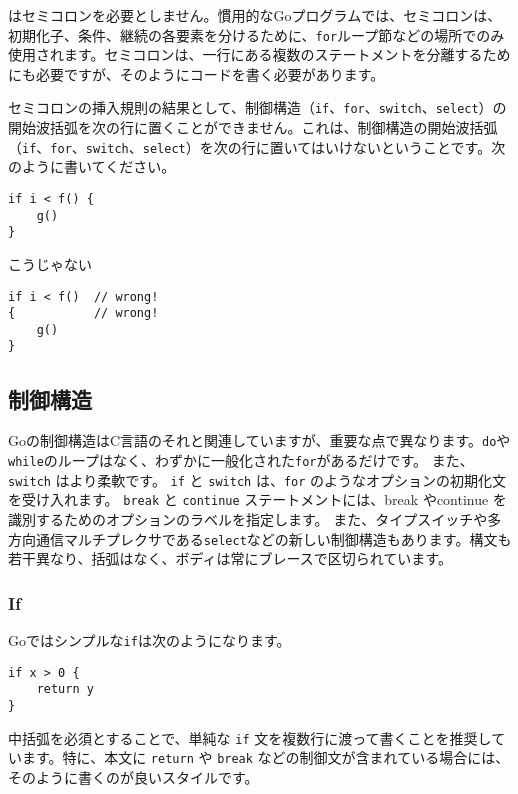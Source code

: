 \documentclass{jsarticle}
\begin{document}
はセミコロンを必要としません。慣用的なGoプログラムでは、セミコロンは、初期化子、条件、継続の各要素を分けるために、\texttt{for}ループ節などの場所でのみ使用されます。セミコロンは、一行にある複数のステートメントを分離するためにも必要ですが、そのようにコードを書く必要があります。

セミコロンの挿入規則の結果として、制御構造（\texttt{if}、\texttt{for}、\texttt{switch}、\texttt{select}）の開始波括弧を次の行に置くことができません。これは、制御構造の開始波括弧（\texttt{if}、\texttt{for}、\texttt{switch}、\texttt{select}）を次の行に置いてはいけないということです。次のように書いてください。

\begin{lstlisting}[numbers=none]
if i < f() {
    g()
}
\end{lstlisting}

こうじゃない

\begin{lstlisting}[numbers=none]
if i < f()  // wrong!
{           // wrong!
    g()
}
\end{lstlisting}

\subsection{制御構造}

Goの制御構造はC言語のそれと関連していますが、重要な点で異なります。\texttt{do}や\texttt{while}のループはなく、わずかに一般化された\texttt{for}があるだけです。
また、\texttt{switch} はより柔軟です。 \texttt{if} と \texttt{switch}
は、\texttt{for} のようなオプションの初期化文を受け入れます。
\texttt{break} と \texttt{continue} ステートメントには、break やcontinue
を識別するためのオプションのラベルを指定します。
また、タイプスイッチや多方向通信マルチプレクサである\texttt{select}などの新しい制御構造もあります。構文も若干異なり、括弧はなく、ボディは常にブレースで区切られています。

\subsubsection{If}

Goではシンプルな\texttt{if}は次のようになります。

\begin{lstlisting}[numbers=none]
if x > 0 {
    return y
}
\end{lstlisting}

中括弧を必須とすることで、単純な \texttt{if}
文を複数行に渡って書くことを推奨しています。特に、本文に \texttt{return}
や \texttt{break}
などの制御文が含まれている場合には、そのように書くのが良いスタイルです。
\end{document}
